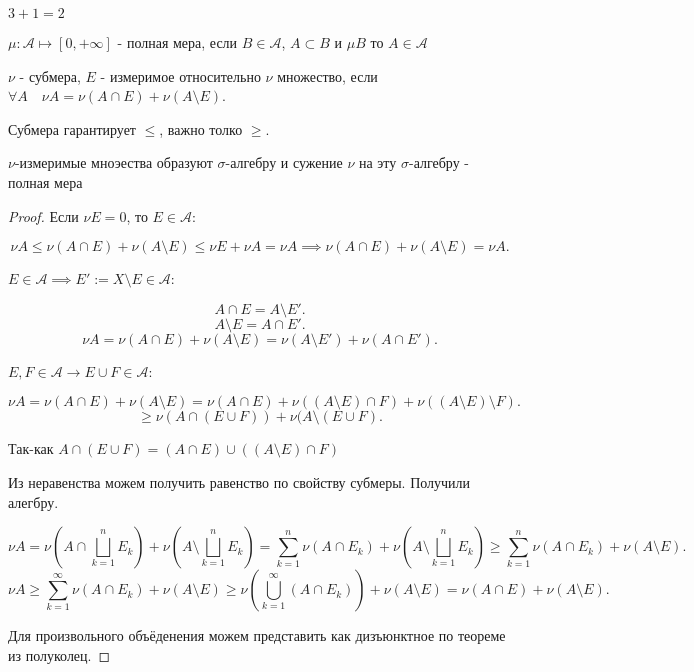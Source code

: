 \begin{remark} \thmslashn

    $3 + 1 = 2$
\end{remark}
\begin{definition} \thmslashn 

    $\mu : \mathcal{A} \mapsto [0, +\infty]$ - полная мера, если $B\in \mathcal{A}$, $A \subset B$ и $\mu B$ то $A\in \mathcal{A}$
\end{definition}
\begin{definition} \thmslashn 

    $\nu$ - субмера, $E$ - измеримое относительно $\nu$ множество, если $\forall{A}\quad \nu A = \nu(A\cap E) + \nu(A \setminus E)$.
\end{definition}
\begin{remark} \thmslashn

    Субмера гарантирует $\le $, важно толко $\ge $.
\end{remark}
\begin{theorem}[Каратеодори] \thmslashn

   $\nu$-измеримые мноэества образуют $\sigma$-алгебру и сужение $\nu$ на эту $\sigma$-алгебру - полная мера
   \begin{proof} \thmslashn
   
       Если $\nu E = 0$, то $E\in \mathcal{A}$:
    
       \[ \nu A \le \nu(A\cap E) + \nu(A \setminus E) \le \nu E + \nu A = \nu A \implies \nu(A\cap E) + \nu(A \setminus E) = \nu A .\] 

       $E\in \mathcal{A} \implies E' := X \setminus E\in \mathcal{A}$:

       \[ A\cap E = A \setminus E' .\]
       \[ A \setminus E = A\cap E' .\]
       \[ \nu A = \nu (A\cap E) + \nu (A \setminus E) = \nu (A \setminus E') + \nu (A\cap E') .\]

       $E, F\in \mathcal{A} \to  E \cup F\in \mathcal{A}$:

       \[ \nu A = \nu(A\cap E) + \nu(A \setminus E) = \nu(A\cap E) + \nu((A \setminus E)\cap F) + \nu((A \setminus E) \setminus F) .\] 
       \[ \ge \nu(A\cap (E \cup F)) + \nu(A \setminus (E \cup F).\]

       Так-как $A\cap (E \cup F) = (A\cap E) \cup ((A \setminus E)\cap F)$

       Из неравенства можем получить равенство по свойству субмеры. Получили алегбру.

       \[ \nu A = \nu \left( A\cap \bigsqcup\limits_{k=1}^{n} E_{k} \right) + \nu\left(A \setminus \bigsqcup\limits_{k=1}^{n} E_{k}\right) = \sum\limits_{k=1}^{n} \nu(A\cap E_{k}) + \nu\left(A \setminus \bigsqcup\limits_{k=1}^{n} E_{k}\right) \ge \sum\limits_{k=1}^{n} \nu(A\cap E_{k}) + \nu (A \setminus E) .\]
       \[ \nu A \ge \sum\limits_{k=1}^{\infty} \nu(A\cap E_{k}) + \nu(A \setminus E) \ge \nu \left( \bigcup_{k=1}^{\infty} (A\cap E_{k}) \right) + \nu(A \setminus E) = \nu(A\cap E) + \nu(A \setminus E)  .\]

       Для произвольного объёденения можем представить как дизъюнктное по теореме из полуколец.

   \end{proof}
\end{theorem}
